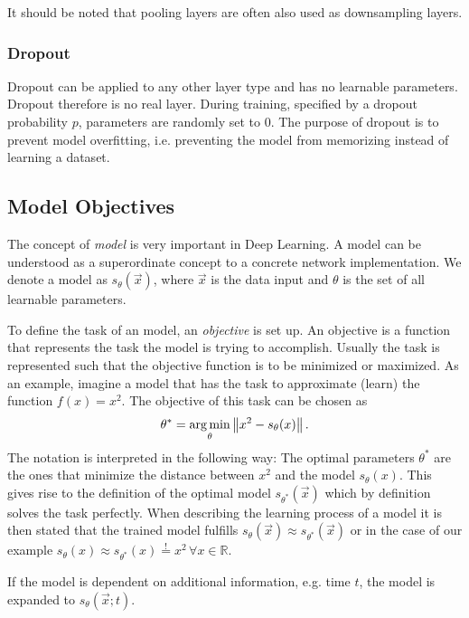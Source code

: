 It should be noted that pooling layers are often also used as downsampling layers.
%
\subsubsection{Dropout }
Dropout can be applied to any other layer type and has no learnable parameters. Dropout therefore is no real layer. During training, specified by a dropout probability $p$, parameters are randomly set to $0$. The purpose of dropout is to prevent model overfitting, i.e. preventing the model from memorizing instead of learning a dataset.
%
\subsection{Model Objectives}
The concept of \textit{model} is very important in Deep Learning. A model can be understood as a superordinate concept to a concrete network implementation. We denote a model as $s_\theta(\vec{x})$, where $\vec{x}$ is the data input and $\theta$ is the set of all learnable parameters.

To define the task of an model, an \textit{objective} is set up. An objective is a function that represents the task the model is trying to accomplish. Usually the task is represented such that the objective function is to be minimized or maximized. As an example, imagine a model that has the task to approximate (learn) the function $f(x)=x^2$. The objective of this task can be chosen as
%
\begin{equation} 
    \theta^*=\underset{\theta}{\arg \min}\left\lVert x^2-s_\theta(x)\right\rVert.
\end{equation}
%
The notation is interpreted in the following way: The optimal parameters $\theta^*$ are the ones that minimize the distance between $x^2$ and the model $s_\theta(x)$. This gives rise to the definition of the optimal model $s_{\theta^*}(\vec{x})$ which by definition solves the task perfectly. When describing the learning process of a model it is then stated that the trained model fulfills $s_\theta(\vec{x})\approx s_{\theta^*}(\vec{x})$ or in the case of our example $s_\theta(x)\approx s_{\theta^*}(x)\overset{!}{=}x^2\,\forall x\in\mathbb{R}$.

If the model is dependent on additional information, e.g. time $t$, the model is expanded to $s_\theta(\vec{x}; t)$. 
%
